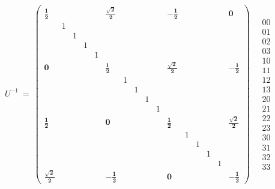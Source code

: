 \documentclass[12pt]{article}
\begin{document}
\begin{equation}
U^{-1}\ =\ 
\begin{pmatrix}
\label{eq:not_U}
\pmb{\frac{1}{2}} &&&&& \pmb{\frac{\sqrt{2}}{2}} &&&&& \pmb{-\frac{1}{2}} &&&&& \pmb{0} \\
  & 1 &   &   &   &   &   &   &   &   &   &   &   &   &   &   \\
  &   & 1 &   &   &   &   &   &   &   &   &   &   &   &   &   \\
  &   &   & 1 &   &   &   &   &   &   &   &   &   &   &   &   \\
  &   &   &   & 1 &   &   &   &   &   &   &   &   &   &   &   \\
\pmb{0} &&&&& \pmb{\frac{1}{2}} &&&&& \pmb{\frac{\sqrt{2}}{2}} &&&&& \pmb{-\frac{1}{2}} \\
  &   &   &   &   &   & 1 &   &   &   &   &   &   &   &   &   \\
  &   &   &   &   &   &   & 1 &   &   &   &   &   &   &   &   \\
  &   &   &   &   &   &   &   & 1 &   &   &   &   &   &   &   \\
  &   &   &   &   &   &   &   &   & 1 &   &   &   &   &   &   \\
\pmb{\frac{1}{2}} &&&&& \pmb{0} &&&&& \pmb{\frac{1}{2}} &&&&& \pmb{\frac{\sqrt{2}}{2}} \\
  &   &   &   &   &   &   &   &   &   &   & 1 &   &   &   &   \\
  &   &   &   &   &   &   &   &   &   &   &   & 1 &   &   &   \\
  &   &   &   &   &   &   &   &   &   &   &   &   & 1 &   &   \\
  &   &   &   &   &   &   &   &   &   &   &   &   &   & 1 &   \\
\pmb{\frac{\sqrt{2}}{2}} &&&&& \pmb{-\frac{1}{2}} &&&&& \pmb{0} &&&&& \pmb{-\frac{1}{2}} 
\end{pmatrix}
\quad
\begin{matrix}
00 \\ 01 \\ 02 \\ 03 \\ 10 \\ 11 \\ 12 \\ 13 \\ 20 \\ 21 \\ 22 \\ 23 \\ 30 \\ 31 \\ 32 \\ 33 
\end{matrix}
\end{equation}
\end{document}
